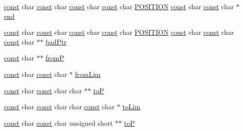 \begin{DoxyCompactItemize}
\item 
\hyperlink{getopt1_8c_a2c212835823e3c54a8ab6d95c652660e}{const} char \hyperlink{getopt1_8c_a2c212835823e3c54a8ab6d95c652660e}{const} char \hyperlink{getopt1_8c_a2c212835823e3c54a8ab6d95c652660e}{const} char \hyperlink{getopt1_8c_a2c212835823e3c54a8ab6d95c652660e}{const} char \hyperlink{xmltok_8h_acbc9ec28b807eebf9d62149084c952b1}{P\+O\+S\+I\+T\+I\+ON} \hyperlink{getopt1_8c_a2c212835823e3c54a8ab6d95c652660e}{const} char \hyperlink{getopt1_8c_a2c212835823e3c54a8ab6d95c652660e}{const} char $\ast$ \hyperlink{structencoding_a049c4d9fc04216e6368851a75c7dd414}{end}
\item 
\hyperlink{getopt1_8c_a2c212835823e3c54a8ab6d95c652660e}{const} char \hyperlink{getopt1_8c_a2c212835823e3c54a8ab6d95c652660e}{const} char \hyperlink{getopt1_8c_a2c212835823e3c54a8ab6d95c652660e}{const} char \hyperlink{getopt1_8c_a2c212835823e3c54a8ab6d95c652660e}{const} char \hyperlink{xmltok_8h_acbc9ec28b807eebf9d62149084c952b1}{P\+O\+S\+I\+T\+I\+ON} \hyperlink{getopt1_8c_a2c212835823e3c54a8ab6d95c652660e}{const} char \hyperlink{getopt1_8c_a2c212835823e3c54a8ab6d95c652660e}{const} char \hyperlink{getopt1_8c_a2c212835823e3c54a8ab6d95c652660e}{const} char $\ast$$\ast$ \hyperlink{structencoding_a3842477d4481d822ee608c01b1d99e16}{bad\+Ptr}
\item 
\hyperlink{getopt1_8c_a2c212835823e3c54a8ab6d95c652660e}{const} char $\ast$$\ast$ \hyperlink{structencoding_a360cf1537ca9bd86b123b8b323fe8433}{fromP}
\item 
\hyperlink{getopt1_8c_a2c212835823e3c54a8ab6d95c652660e}{const} char \hyperlink{getopt1_8c_a2c212835823e3c54a8ab6d95c652660e}{const} char $\ast$ \hyperlink{structencoding_a51d2a830b3a5f30129f7140209e6800f}{from\+Lim}
\item 
\hyperlink{getopt1_8c_a2c212835823e3c54a8ab6d95c652660e}{const} char \hyperlink{getopt1_8c_a2c212835823e3c54a8ab6d95c652660e}{const} char char $\ast$$\ast$ \hyperlink{structencoding_ab10b959825711c5280c0f9cc2a491c5d}{toP}
\item 
\hyperlink{getopt1_8c_a2c212835823e3c54a8ab6d95c652660e}{const} char \hyperlink{getopt1_8c_a2c212835823e3c54a8ab6d95c652660e}{const} char char \hyperlink{getopt1_8c_a2c212835823e3c54a8ab6d95c652660e}{const} char $\ast$ \hyperlink{structencoding_ad121e4388d5369e25c2d8e5f2d0bc036}{to\+Lim}
\item 
\hyperlink{getopt1_8c_a2c212835823e3c54a8ab6d95c652660e}{const} char \hyperlink{getopt1_8c_a2c212835823e3c54a8ab6d95c652660e}{const} char unsigned short $\ast$$\ast$ \hyperlink{structencoding_af00d6198ca0eb6034520f814d6972dfd}{toP}

\end{DoxyCompactItemize}
